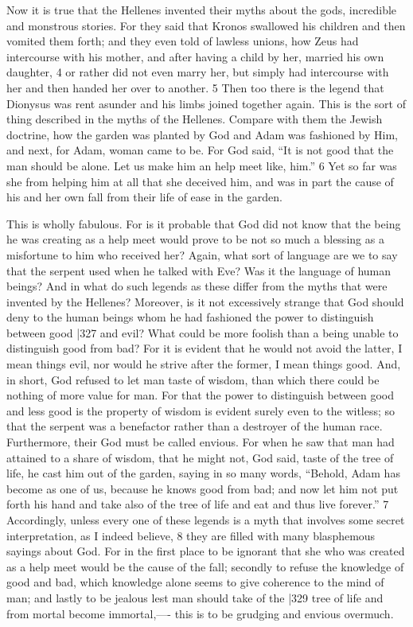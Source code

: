 Now it is true that the Hellenes invented their myths about the gods, incredible and monstrous stories. For they said that Kronos swallowed his children and then vomited them forth; and they even told of lawless unions, how Zeus had intercourse with his mother, and after having a child by her, married his own daughter, 4 or rather did not even marry her, but simply had intercourse with her and then handed her over to another. 5 Then too there is the legend that Dionysus was rent asunder and his limbs joined together again. This is the sort of thing described in the myths of the Hellenes. Compare with them the Jewish doctrine, how the garden was planted by God and Adam was fashioned by Him, and next, for Adam, woman came to be. For God said, ``It is not good that the man should be alone. Let us make him an help meet like, him.''
6 Yet so far was she from helping him at all that she deceived him, and was in part the cause of his and her own fall from their life of ease in the garden.

This is wholly fabulous. For is it probable that God did not know that the being he was creating as a help meet would prove to be not so much a blessing as a misfortune to him who received her? Again, what sort of language are we to say that the serpent used when he talked with Eve? Was it the language of human beings? And in what do such legends as these differ from the myths that were invented by the Hellenes? Moreover, is it not excessively strange that God should deny to the human beings whom he had fashioned the power to distinguish between good
|327 and evil? What could be more foolish than a being unable to distinguish good from bad? For it is evident that he would not avoid the latter, I mean things evil, nor would he strive after the former, I mean things good. And, in short, God refused to let man taste of wisdom, than which there could be nothing of more value for man. For that the power to distinguish between good and less good is the property of wisdom is evident surely even to the witless; so that the serpent was a benefactor rather than a destroyer of the human race. Furthermore, their God must be called envious. For when he saw that man had attained to a share of wisdom, that he might not, God said, taste of the tree of life, he cast him out of the garden, saying in so many words, ``Behold, Adam has become as one of us, because he knows good from bad; and now let him not put forth his hand and take also of the tree of life and eat and thus live forever.''
7 Accordingly, unless every one of these legends is a myth that involves some secret interpretation, as I indeed believe,
8 they are filled with many blasphemous sayings about God. For in the first place to be ignorant that she who was created as a help meet would be the cause of the fall; secondly to refuse the knowledge of good and bad, which knowledge alone seems to give coherence to the mind of man; and lastly to be jealous lest man should take of the
|329 tree of life and from mortal become immortal,---- this is to be grudging and envious overmuch.

